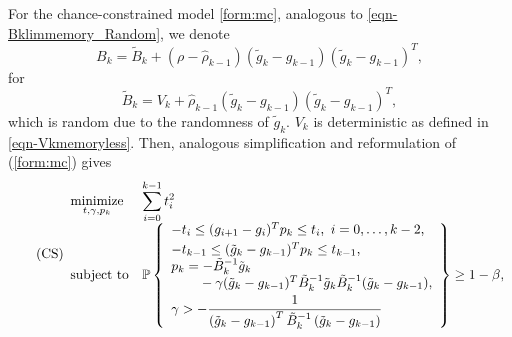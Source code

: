 \documentclass[11pt,twoside]{article}
\def\AFcomment#1{{\color{red}\emph{AF: #1}}}
\begin{document}
For the chance-constrained model \eqref{form:mc}, analogous to
\eqref{eqn-Bklimmemory_Random}, we denote
\begin{equation}\label{eqn-Bk_Random}
B_k  = \tilde B_k + (\rho-\hat\rho_{k-1})  ( \tilde g_k - g_{k-1} ) ( \tilde
g_k - g_{k-1})^T,
\end{equation}
for
\begin{equation}\label{eqn-barBk_Random}
\tilde B_k = V_k +  \hat\rho_{k-1} ( \tilde g_k - g_{k-1} ) ( \tilde
g_k - g_{k-1} )^T,
\end{equation}
which is random due to the randomness of $\tilde g_k$.
$V_k$ is deterministic as defined in \eqref{eqn-Vkmemoryless}.
Then, analogous
simplification and reformulation of (\ref{form:mc}) gives
\begin{equation}\label{form:ppb-sc}\tag{CS}
\begin{array}{llll}
        \minimize{t,\gamma,p_k} & \disp\sum_{i=0}^{k-1} t_i^2  \\
         \subject & \disp\mathbb{P} \left\{
        \begin{array}{l}
        -t_i \le (g_{i+1}- g_i)^T p_k \le t_i, \ i = 0,\dots,k-2, \\ [1mm]
        -t_{k-1} \le (\tilde{g}_k- g_{k-1})^T p_k \le t_{k-1}, \\
p_k =-\tilde B_k^{-1}\tilde{g}_k \\
\phantom{p_k =}
 -\gamma ( \tilde{g}_k - g_{k-1} )^T\tilde B_k^{-1}
 \tilde{g}_k\tilde B_k^{-1} ( \tilde{g}_k - g_{k-1} ), \\[1mm]
\disp \gamma >
  -\frac{1}{\left( \tilde{g}_k - g_{k-1} \right)^T \tilde B_k^{-1}\left( \tilde{g}_k - g_{k-1}
    \right)}%
        \end{array}
        \right\} \ge 1-\beta, \\
\end{array}
\end{equation}


\end{document}
